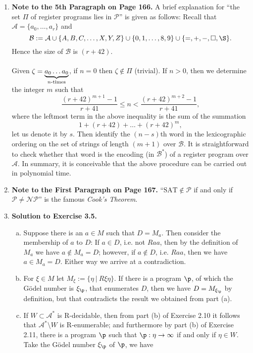 \begin{enumerate}[1.]
\item \textbf{Note to the 5th Paragraph on Page 166.} A brief explanation for ``the set $\Pi$ of register programs lies in $\mathcal{P}$'' is given as follows: Recall that $\mathcal{A} = \{ a_0, \ldots, a_r \}$ and
\[
\mathcal{B} := \mathcal{A} \cup \{ A, B, C, \ldots, X, Y, Z \} \cup \{ 0, 1, \ldots, 8, 9 \} \cup \{ =, +, -, \Box, \S \}.
\]
Hence the size of $\mathcal{B}$ is $(r + 42)$.\\
\ \\
Given $\zeta = \underbrace{a_0 \ldots a_0}_{n\mbox{\scriptsize-times}}$, if $n = 0$ then $\zeta \not\in \Pi$ (trivial). If $n > 0$, then we determine the integer $m$ such that
\[
\frac{(r + 42)^{m + 1} - 1}{r + 41} \leq n < \frac{(r + 42)^{m + 2} - 1}{r + 41},
\]
where the leftmost term in the above inequality is the sum of the summation
\[
1 + (r + 42) + \ldots + (r + 42)^m,
\]
let us denote it by $s$. Then identify the $(n - s)$th word in the lexicographic ordering on the set of strings of length $(m + 1)$ over $\mathcal{B}$. It is straightforward to check whether that word is the encoding (in $\mathcal{B}^\ast$) of a register program over $\mathcal{A}$. In summary, it is conceivable that the above procedure can be carried out in polynomial time.
%
\item \textbf{Note to the First Paragraph on Page 167.} ``$\mathrm{SAT} \not\in \mathcal{P}$ if and only if $\mathcal{P} \neq \mathcal{NP}$'' is the famous \emph{Cook's Theorem}.
%
\item \textbf{Solution to Exercise 3.5.}
\begin{enumerate}[(a)]
\item Suppose there is an $a \in M$ such that $D = M_a$. Then consider the membership of $a$ to $D$: If $a \in D$, i.e. not $Raa$, then by the definition of $M_a$ we have $a \not\in M_a = D$; however, if $a \not\in D$, i.e. $Raa$, then we have $a \in M_a = D$. Either way we arrive at a contradiction.
\item For $\xi \in M$ let $M_\xi := \{ \eta \ | \ R\xi\eta \}$. If there is a program $\p$, of which the G\"{o}del number is $\xi_\p$, that enumerates $D$, then we have $D = M_{\xi_\p}$ by definition, but that contradicts the result we obtained from part (a).
\item If $W \subset \mathcal{A}^\ast$ is R-decidable, then from part (b) of Exercise 2.10 it follows that $\mathcal{A}^\ast \setminus W$ is R-enumerable; and furthermore by part (b) of Exercise 2.11, there is a program $\p$ such that $\p: \eta \to \infty$ if and only if $\eta \in W$. Take the G\"{o}del number $\xi_\p$ of $\p$, we have

\end{enumerate}
\end{enumerate}
